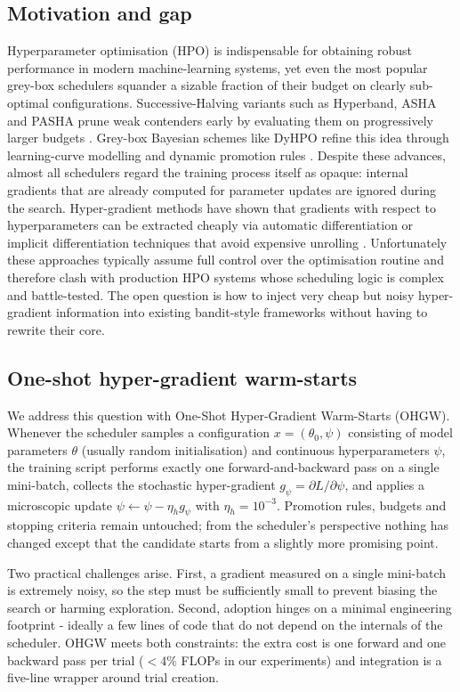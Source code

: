 \documentclass{article} %
\begin{document}
\subsection{Motivation and gap}
Hyperparameter optimisation (HPO) is indispensable for obtaining robust performance in modern machine-learning systems, yet even the most popular grey-box schedulers squander a sizable fraction of their budget on clearly sub-optimal configurations. Successive-Halving variants such as Hyperband, ASHA and PASHA prune weak contenders early by evaluating them on progressively larger budgets \cite{bohdal-2022-pasha}. Grey-box Bayesian schemes like DyHPO refine this idea through learning-curve modelling and dynamic promotion rules \cite{wistuba-2022-supervising}. Despite these advances, almost all schedulers regard the training process itself as opaque: internal gradients that are already computed for parameter updates are ignored during the search. Hyper-gradient methods have shown that gradients with respect to hyperparameters can be extracted cheaply via automatic differentiation \cite{chandra-2019-gradient} or implicit differentiation techniques that avoid expensive unrolling \cite{bertrand-2020-implicit}. Unfortunately these approaches typically assume full control over the optimisation routine and therefore clash with production HPO systems whose scheduling logic is complex and battle-tested. The open question is how to inject very cheap but noisy hyper-gradient information into existing bandit-style frameworks without having to rewrite their core.

\subsection{One-shot hyper-gradient warm-starts}
We address this question with One-Shot Hyper-Gradient Warm-Starts (OHGW). Whenever the scheduler samples a configuration \(x=(\theta_0,\psi)\) consisting of model parameters \(\theta\) (usually random initialisation) and continuous hyperparameters \(\psi\), the training script performs exactly one forward-and-backward pass on a single mini-batch, collects the stochastic hyper-gradient \(g_{\psi}=\partial L/\partial \psi\), and applies a microscopic update \(\psi \leftarrow \psi - \eta_h g_{\psi}\) with \(\eta_h = 10^{-3}\). Promotion rules, budgets and stopping criteria remain untouched; from the scheduler's perspective nothing has changed except that the candidate starts from a slightly more promising point.

Two practical challenges arise. First, a gradient measured on a single mini-batch is extremely noisy, so the step must be sufficiently small to prevent biasing the search or harming exploration. Second, adoption hinges on a minimal engineering footprint - ideally a few lines of code that do not depend on the internals of the scheduler. OHGW meets both constraints: the extra cost is one forward and one backward pass per trial (\(<4\%\) FLOPs in our experiments) and integration is a five-line wrapper around trial creation.
\end{document}
